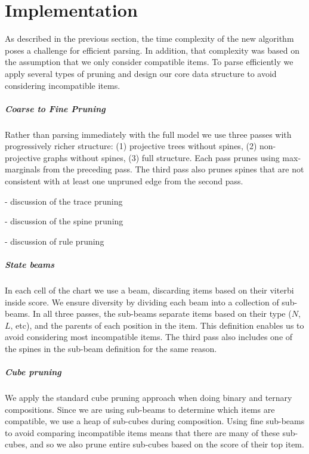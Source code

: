 \chapter{Implementation}

As described in the previous section, the time complexity of the new algorithm poses a challenge for efficient parsing.
In addition, that complexity was based on the assumption that we only consider compatible items.
To parse efficiently we apply several types of pruning and design our core data structure to avoid considering incompatible items.

\paragraph{Coarse to Fine Pruning \cite{Goodman:1997}}
Rather than parsing immediately with the full model we use three passes with progressively richer structure:
(1) projective trees without spines,
(2) non-projective graphs without spines,
(3) full structure.
Each pass prunes using max-marginals from the preceding pass.
The third pass also prunes spines that are not consistent with at least one unpruned edge from the second pass.

 - discussion of the trace pruning

 - discussion of the spine pruning

 - discussion of rule pruning

\paragraph{State beams}
In each cell of the chart we use a beam, discarding items based on their viterbi inside score.
We ensure diversity by dividing each beam into a collection of sub-beams.
In all three passes, the sub-beams separate items based on their type ($N$, $L$, etc), and the parents of each position in the item.
This definition enables us to avoid considering most incompatible items.
The third pass also includes one of the spines in the sub-beam definition for the same reason.

\paragraph{Cube pruning  \cite{Chiang:2007}}
We apply the standard cube pruning approach when doing binary and ternary compositions.
Since we are using sub-beams to determine which items are compatible, we use a heap of sub-cubes during composition.
Using fine sub-beams to avoid comparing incompatible items means that there are many of these sub-cubes, and so we also prune entire sub-cubes based on the score of their top item.

